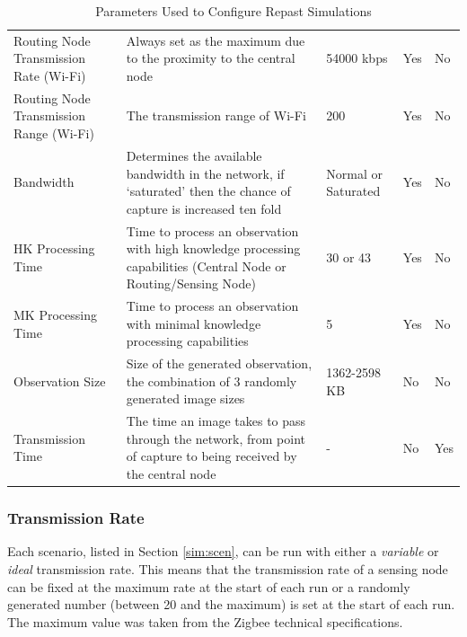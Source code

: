\begin{landscape}
\begin{table}
\begin{tabularx}{\textwidth}{|p{4cm}|p{10cm}|p{3cm}|p{2cm}|p{2cm}|}
	Routing Node Transmission Rate (Wi-Fi)  & Always set as the maximum due to the proximity to the central node                                                          & 54000 kbps          & Yes                & No                 \\
	Routing Node Transmission Range (Wi-Fi) & The transmission range of Wi-Fi                                                                                             & 200                 & Yes                & No                 \\
	Bandwidth                               & Determines the available bandwidth in the network, if `saturated' then the chance of capture is increased ten fold          & Normal or Saturated & Yes                & No                 \\
	HK Processing Time                      & Time to process an observation with high knowledge processing capabilities (Central Node or Routing/Sensing Node)           & 30 or 43            & Yes                & No                 \\
	MK Processing Time                      & Time to process an observation with minimal knowledge processing capabilities                                               & 5                   & Yes                & No                 \\
	Observation Size                        & Size of the generated observation, the combination of 3 randomly generated image sizes                                      & 1362-2598 KB        & No                 & No                 \\
	Transmission Time                       & The time an image takes to pass through the network, from point of capture to being received by the central node            & -                   & No                 & Yes               
	\end{tabularx}
	\caption{Parameters Used to Configure Repast Simulations}
	\end{table}
    \label{sim:tab:params}
	\end{landscape}

	\subsubsection{Transmission Rate}
	Each scenario, listed in Section \ref{sim:scen}, can be run with either a \textit{variable} or \textit{ideal} transmission rate. This means that the transmission rate of a sensing node can be fixed at the maximum rate at the start of each run or a randomly generated number (between 20 and the maximum) is set at the start of each run. The maximum value was taken from the Zigbee technical specifications.


